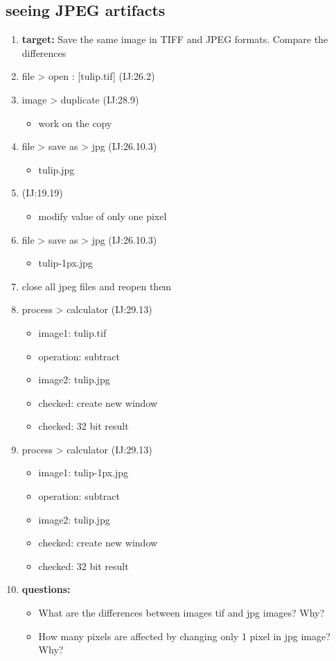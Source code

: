 \documentclass[11pt]{article}
\begin{document}
\subsection{seeing JPEG artifacts}
\label{sec-3-7}
\begin{enumerate}
\item \textbf{target:} Save the same image in TIFF and JPEG formats. Compare
the differences
\item file > open : [tulip.tif] (IJ:26.2)
\item image > duplicate (IJ:28.9)
\begin{itemize}
\item work on the copy
\end{itemize}
\item file > save as > jpg (IJ:26.10.3)
\begin{itemize}
\item tulip.jpg
\end{itemize}
\item{} (IJ:19.19)
\begin{itemize}
\item modify value of only one pixel
\end{itemize}
\item file > save as > jpg (IJ:26.10.3)
\begin{itemize}
\item tulip-1px.jpg
\end{itemize}
\item close all jpeg files and reopen them
\item process > calculator (IJ:29.13)
\begin{itemize}
\item image1: tulip.tif
\item operation: subtract
\item image2: tulip.jpg
\item checked: create new window
\item checked: 32 bit result
\end{itemize}
\item process > calculator (IJ:29.13)
\begin{itemize}
\item image1: tulip-1px.jpg
\item operation: subtract
\item image2: tulip.jpg
\item checked: create new window
\item checked: 32 bit result
\end{itemize}
\item \textbf{questions:}
\begin{itemize}
\item What are the differences between images tif and jpg images? Why?
\item How many pixels are affected by changing only 1 pixel in jpg
image? Why?
\end{itemize}
\end{enumerate}
\end{document}
